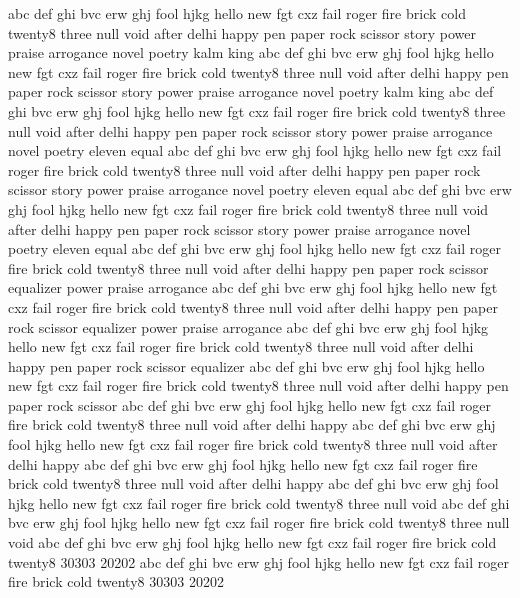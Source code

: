 abc	def	ghi	bvc	erw	ghj	fool	hjkg	hello	new	fgt	cxz	fail	roger	fire	brick	cold	twenty8	three	null	void	after	delhi	happy	pen	paper	rock	scissor	story	power	praise	arrogance	novel	poetry	kalm	king												
abc	def	ghi	bvc	erw	ghj	fool	hjkg	hello	new	fgt	cxz	fail	roger	fire	brick	cold	twenty8	three	null	void	after	delhi	happy	pen	paper	rock	scissor	story	power	praise	arrogance	novel	poetry	kalm	king												
abc	def	ghi	bvc	erw	ghj	fool	hjkg	hello	new	fgt	cxz	fail	roger	fire	brick	cold	twenty8	three	null	void	after	delhi	happy	pen	paper	rock	scissor	story	power	praise	arrogance	novel	poetry	eleven	equal												
abc	def	ghi	bvc	erw	ghj	fool	hjkg	hello	new	fgt	cxz	fail	roger	fire	brick	cold	twenty8	three	null	void	after	delhi	happy	pen	paper	rock	scissor	story	power	praise	arrogance	novel	poetry	eleven	equal												
abc	def	ghi	bvc	erw	ghj	fool	hjkg	hello	new	fgt	cxz	fail	roger	fire	brick	cold	twenty8	three	null	void	after	delhi	happy	pen	paper	rock	scissor	story	power	praise	arrogance	novel	poetry	eleven	equal												
abc	def	ghi	bvc	erw	ghj	fool	hjkg	hello	new	fgt	cxz	fail	roger	fire	brick	cold	twenty8	three	null	void	after	delhi	happy	pen	paper	rock	scissor	equalizer	power	praise	arrogance																
abc	def	ghi	bvc	erw	ghj	fool	hjkg	hello	new	fgt	cxz	fail	roger	fire	brick	cold	twenty8	three	null	void	after	delhi	happy	pen	paper	rock	scissor	equalizer	power	praise	arrogance																
abc	def	ghi	bvc	erw	ghj	fool	hjkg	hello	new	fgt	cxz	fail	roger	fire	brick	cold	twenty8	three	null	void	after	delhi	happy	pen	paper	rock	scissor	equalizer																			
abc	def	ghi	bvc	erw	ghj	fool	hjkg	hello	new	fgt	cxz	fail	roger	fire	brick	cold	twenty8	three	null	void	after	delhi	happy	pen	paper	rock	scissor																				
abc	def	ghi	bvc	erw	ghj	fool	hjkg	hello	new	fgt	cxz	fail	roger	fire	brick	cold	twenty8	three	null	void	after	delhi	happy																								
abc	def	ghi	bvc	erw	ghj	fool	hjkg	hello	new	fgt	cxz	fail	roger	fire	brick	cold	twenty8	three	null	void	after	delhi	happy																								
abc	def	ghi	bvc	erw	ghj	fool	hjkg	hello	new	fgt	cxz	fail	roger	fire	brick	cold	twenty8	three	null	void	after	delhi	happy																								
abc	def	ghi	bvc	erw	ghj	fool	hjkg	hello	new	fgt	cxz	fail	roger	fire	brick	cold	twenty8	three	null	void																											
abc	def	ghi	bvc	erw	ghj	fool	hjkg	hello	new	fgt	cxz	fail	roger	fire	brick	cold	twenty8	three	null	void																											
abc	def	ghi	bvc	erw	ghj	fool	hjkg	hello	new	fgt	cxz	fail	roger	fire	brick	cold	twenty8	30303	20202																												
abc	def	ghi	bvc	erw	ghj	fool	hjkg	hello	new	fgt	cxz	fail	roger	fire	brick	cold	twenty8	30303	20202																												

